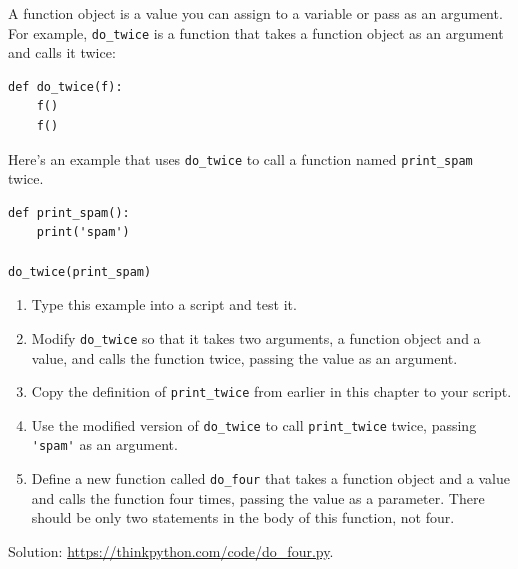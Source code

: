 \documentclass[10pt]{book}
\begin{document}
\begin{exercise}

A function object is a value you can assign to a variable
or pass as an argument.  For example, \verb"do_twice" is a function
that takes a function object as an argument and calls it twice:

\begin{verbatim}
def do_twice(f):
    f()
    f()
\end{verbatim}

Here's an example that uses \verb"do_twice" to call a function
named \verb"print_spam" twice.

\begin{verbatim}
def print_spam():
    print('spam')

do_twice(print_spam)
\end{verbatim}

\begin{enumerate}

\item Type this example into a script and test it.

\item Modify \verb"do_twice" so that it takes two arguments, a
function object and a value, and calls the function twice,
passing the value as an argument.

\item Copy the definition of
\verb"print_twice" from earlier in this chapter to your script.

\item Use the modified version of \verb"do_twice" to call
\verb"print_twice" twice, passing \verb"'spam'" as an argument.

\item Define a new function called
\verb"do_four" that takes a function object and a value
and calls the function four times, passing the value
as a parameter.  There should be only
two statements in the body of this function, not four.

\end{enumerate}

Solution: \url{https://thinkpython.com/code/do_four.py}.

\end{exercise}
\end{document}
